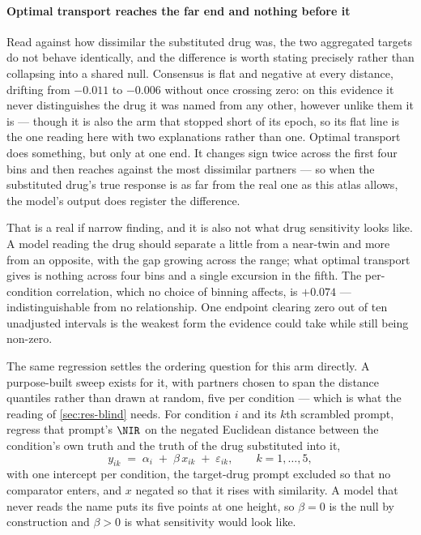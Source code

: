 \paragraph{Optimal transport reaches the far end and nothing before it} Read
against how dissimilar the substituted drug was, the two aggregated targets do
not behave identically, and the difference is worth stating precisely rather than
collapsing into a shared null. Consensus is flat and negative at every distance,
drifting from $-0.011$ to $-0.006$ without once crossing zero: on this evidence
it never distinguishes the drug it was named from any other, however unlike them
it is --- though it is also the arm that stopped short of its epoch, so its flat
line is the one reading here with two explanations rather than one. Optimal transport does something, but only at one end. It changes sign twice
across the first four bins and then reaches
 against the most dissimilar partners --- so when the
substituted drug's true response is as far from the real one as this atlas
allows, the model's output does register the difference.

That is a real if narrow finding, and it is also not what drug sensitivity looks
like. A model reading the drug should separate a little from a near-twin and more
from an opposite, with the gap growing across the range; what optimal transport
gives is nothing across four bins and a single excursion in the fifth. The
per-condition correlation, which no choice of binning affects, is $+0.074$ ---
indistinguishable from no relationship. One endpoint clearing zero out of ten
unadjusted intervals is the weakest form the evidence could take while still
being non-zero.

The same regression settles the ordering question for this arm directly. A
purpose-built sweep exists for it, with partners chosen to span the distance
quantiles rather than drawn at random, five per condition --- which is what the
reading of \cref{sec:res-blind} needs. For condition $i$ and its $k$th scrambled
prompt, regress that prompt's $\NIR$ on the negated Euclidean distance between the
condition's own truth and the truth of the drug substituted into it,
\begin{equation}
 y_{ik} \;=\; \alpha_i \;+\; \beta\,x_{ik} \;+\; \varepsilon_{ik},
 \qquad k = 1,\dots,5,
\end{equation}
with one intercept per condition, the target-drug prompt excluded so that no
comparator enters, and $x$ negated so that it rises with similarity. A model that
never reads the name puts its five points at one height, so $\beta = 0$ is the null
by construction and $\beta > 0$ is what sensitivity would look like.

